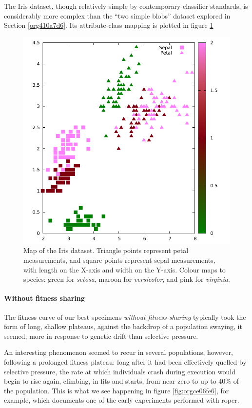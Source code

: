 \documentclass[12pt,glossary]{dalthesis}
\begin{document}
The Iris dataset, though relatively simple by contemporary classifier standards, 
is considerably more complex than the ``two simple blobs'' dataset explored in
Section \ref{org410a7d6}. Its attribute-class mapping is plotted
in figure \ref{fig:orgc033e58}

\begin{figure}[htbp]
\centering
\includegraphics[width=.9\linewidth]{../images/plots/iris_plot.pdf}
\caption{\label{fig:orgc033e58}
Map of the Iris dataset. Triangle points represent petal measurements, and square points represent sepal measurements, with length on the X-axis and width on the Y-axis. Colour maps to species: green for \emph{setosa}, maroon for \emph{versicolor}, and pink for \emph{virginia}.}
\end{figure}


\paragraph{Without fitness sharing}
\label{sec:org9d95649}

The fitness curve of our best specimens \emph{without fitness-sharing} typically took
the form of long, shallow plateaus, against the backdrop of a population swaying,
it seemed, more in response to genetic drift than selective pressure.

An interesting phenomenon seemed to recur in several populations, however, following
a prolonged fitness plateau: long after it had been effectively quelled by selective
pressure, the rate at which individuals crash during execution would begin to rise
again, climbing, in fits and starts, from near zero to up to 40\% of the population.
This is what we see happening in figure \ref{fig:orgce06fe6}, for example,
which documents one of the early experiments performed with \gls{roper}.
\end{document}
